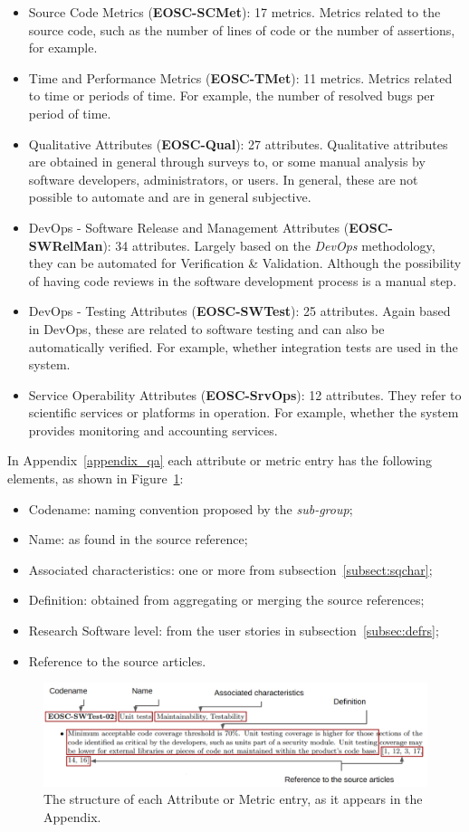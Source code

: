 \begin{itemize}
    \item Source Code Metrics (\textbf{EOSC-SCMet}): 17 metrics. Metrics related to the source code, such as the number of lines of code or the number of assertions, for example.

    \item Time and Performance Metrics (\textbf{EOSC-TMet}): 11 metrics. Metrics related to time or periods of time. For example, the number of resolved bugs per period of time.

    \item Qualitative Attributes (\textbf{EOSC-Qual}): 27 attributes. Qualitative attributes are obtained in general through surveys to, or some manual analysis by software developers, administrators, or users. In general, these are not possible to automate and are in general subjective.

    \item DevOps - Software Release and Management Attributes (\textbf{EOSC-SWRelMan}): 34 attributes. Largely based on the \textit{DevOps} methodology, they can be automated for Verification \& Validation. Although the possibility of having code reviews in the software development process is a manual step.

    \item DevOps - Testing Attributes (\textbf{EOSC-SWTest}): 25 attributes. Again based in DevOps, these are related to software testing and can also be automatically verified. For example, whether integration tests are used in the system.

    \item Service Operability Attributes (\textbf{EOSC-SrvOps}): 12 attributes. They refer to scientific services or platforms in operation. For example, whether the system provides monitoring and accounting services.
\end{itemize}

In Appendix~\ref{appendix_qa} each attribute or metric entry has the following elements, as shown in Figure~\ref{fig:sqattr}:

\begin{itemize}
    \item Codename: naming convention proposed by the \textit{sub-group};
    \item Name: as found in the source reference;
    \item Associated characteristics: one or more from subsection~\ref{subsect:sqchar};
    \item Definition: obtained from aggregating or merging the source references;
    \item Research Software level: from the user stories in subsection~\ref{subsec:defrs};
    \item Reference to the source articles.
\end{itemize}

\begin{figure}[h]
    \centering
    \includegraphics[width=0.99\linewidth]{imgs/qa.png}
    \caption{The structure of each Attribute or Metric entry, as it appears in the Appendix.}
    \label{fig:sqattr}
\end{figure}
